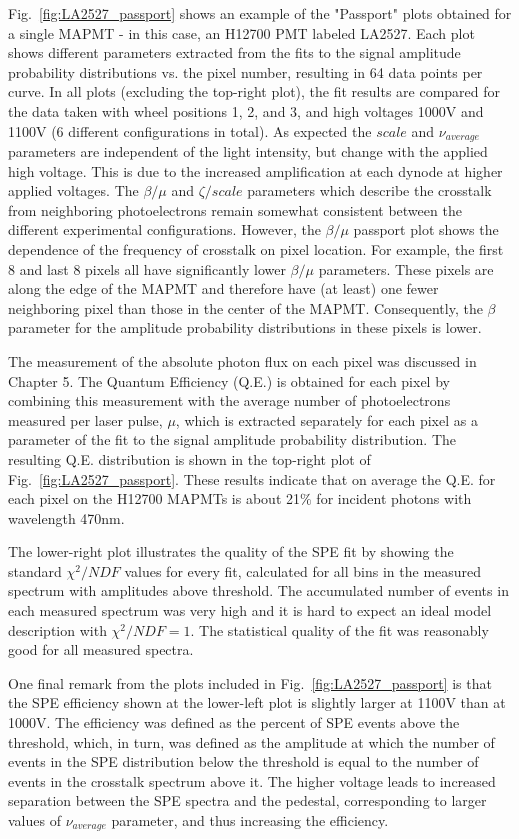 Fig.~\ref{fig:LA2527_passport} shows an example of the "Passport" plots obtained for a single MAPMT - in this case, an H12700 PMT labeled LA2527. 
Each plot shows different parameters extracted from the fits to the signal amplitude probability distributions vs. the pixel number, resulting in 64 data points per curve.
In all plots (excluding the top-right plot), the fit results are compared for the data taken with wheel positions 1, 2, and 3, and high voltages 1000V and 1100V (6 different configurations in total).
As expected the $scale$ and $\nu_{average}$ parameters are independent of the light intensity, but change with the applied high voltage. 
This is due to the increased amplification at each dynode at higher applied voltages.
The $\beta/\mu$ and $\zeta/scale$ parameters which describe the crosstalk from neighboring photoelectrons remain somewhat consistent between the different experimental configurations. 
However, the $\beta/\mu$ passport plot shows the dependence of the frequency of crosstalk on pixel location. For example, the first 8 and last 8 pixels all have significantly lower $\beta/\mu$ parameters. These pixels are along the edge of the MAPMT and therefore have (at least) one fewer neighboring pixel than those in the center of the MAPMT.
Consequently, the $\beta$ parameter for the amplitude probability distributions in these pixels is lower. 

The measurement of the absolute photon flux on each pixel was discussed in Chapter 5. The Quantum Efficiency (Q.E.) is obtained for each pixel by combining this measurement with the average number of photoelectrons measured per laser pulse, $\mu$, which is extracted separately for each pixel as a parameter of the fit to the signal amplitude probability distribution. The resulting Q.E. distribution is shown in the top-right plot of Fig.~\ref{fig:LA2527_passport}. These results indicate that on average the Q.E. for each pixel on the H12700 MAPMTs is about 21$\%$ for incident photons with wavelength 470nm.

The lower-right plot illustrates the quality of the SPE fit by showing the standard $\chi^2/NDF$ values for every fit, calculated for all bins in the measured spectrum with amplitudes above threshold. The accumulated number of events in each measured spectrum was very high and it is hard to expect an ideal model description with $\chi^2/NDF = 1$. The statistical quality of the fit was reasonably good for all measured spectra.

One final remark from the plots included in Fig.~\ref{fig:LA2527_passport} is that the SPE efficiency shown at the lower-left plot is slightly larger at 1100V than at 1000V. The efficiency was defined as the percent of SPE events above the threshold, which, in turn, was defined as the amplitude at which the number of events in the SPE distribution below the threshold is equal to the number of events in the crosstalk spectrum above it. The higher voltage leads to increased separation between the SPE spectra and the pedestal, corresponding to larger values of $\nu_{average}$ parameter, and thus increasing the efficiency. 

